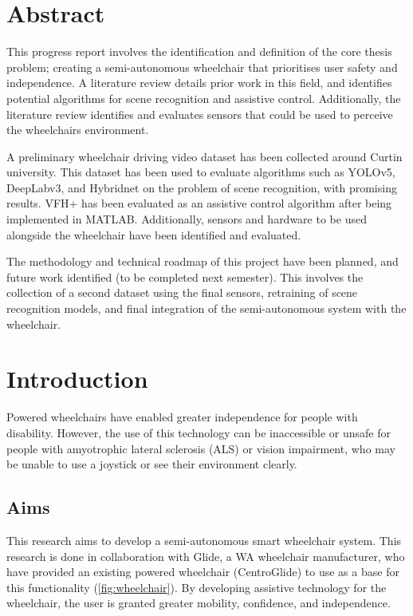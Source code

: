 \documentclass[12pt]{article}
\begin{document}

\thispagestyle{empty}
\pagebreak

\section*{Abstract}

This progress report involves the identification and definition of the core thesis problem;
creating a semi-autonomous wheelchair that prioritises user safety and independence.
A literature review details prior work in this field, and identifies potential algorithms
for scene recognition and assistive control. Additionally, the literature review identifies and evaluates
sensors that could be used to perceive the wheelchairs environment.

A preliminary wheelchair driving video dataset has been collected around Curtin university.
This dataset has been used to evaluate algorithms such as YOLOv5, DeepLabv3, and Hybridnet on
the problem of scene recognition, with promising results. VFH+ has been evaluated as an assistive
control algorithm after being implemented in MATLAB. Additionally, sensors and hardware to be used
alongside the wheelchair have been identified and evaluated.

The methodology and technical roadmap of this project have been planned, and future work identified (to be completed
next semester). This involves the collection of a second dataset using the final sensors, retraining of
scene recognition models, and final integration of the semi-autonomous system with the wheelchair.

\pagebreak

\renewcommand{\contentsname}{Table of Contents}
\tableofcontents
\pagebreak
\listoffigures
\listoftables
\pagebreak





\section{Introduction}
Powered wheelchairs have enabled greater independence for people with disability.
However, the use of this technology can be inaccessible or unsafe for people
with amyotrophic lateral sclerosis (ALS) or vision impairment,
who may be unable to use a joystick or see their environment clearly.

\subsection{Aims}
This research aims to develop a semi-autonomous smart wheelchair system.
This research is done in collaboration with Glide, a WA wheelchair manufacturer,
who have provided an existing powered wheelchair (CentroGlide) to use as a base
for this functionality (\cref{fig:wheelchair}). By developing assistive technology for the wheelchair,
the user is granted greater mobility, confidence, and independence.
\end{document}
